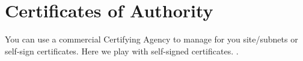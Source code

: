\newpage
\section{Certificates of Authority}

You can use a commercial Certifying Agency to manage 
for you site/subnets or self-sign certificates. Here we play with self-signed certificates.
.


